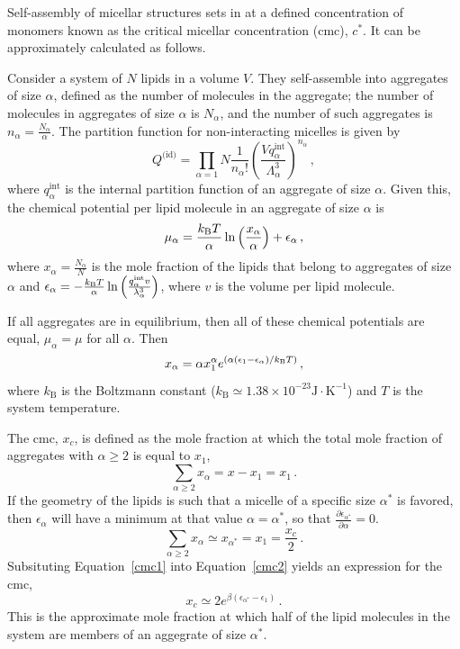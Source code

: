Self-assembly of micellar structures sets in at a defined concentration of monomers known as the critical micellar concentration (cmc), $c^*$.
It can be approximately calculated as follows.

Consider a system of $N$ lipids in a volume $V$.
They self-assemble into aggregates of size $\alpha$, defined as the number of molecules in the aggregate; the number of molecules in aggregates of size $\alpha$ is $N_\alpha$, and the number of such aggregates is $n_\alpha = \frac{N_\alpha}{\alpha}$.
The partition function for non-interacting micelles is given by
\begin{equation}
Q^{\textrm {(id)}} = \prod_{\alpha = 1}{N} \frac{1}{n_\alpha!} \left(\frac{V q_\alpha^{\textrm {int}}}{\Lambda_\alpha^3}\right)^{n_\alpha} \,,
\end{equation}
where $q_\alpha^{\textrm {int}}$ is the internal partition function of an aggregate of size $\alpha$.
Given this, the chemical potential per lipid molecule in an aggregate of size $\alpha$ is
\begin{equation}
\mu_\alpha = \frac{k_{\textrm B} T}{\alpha} \ln\left(\frac{x_\alpha}{\alpha}\right) + \epsilon_\alpha \,,
\end{equation}
where $x_\alpha = \frac{N_\alpha}{N}$ is the mole fraction of the lipids that belong to aggregates of size $\alpha$ and $\epsilon_\alpha = -\frac{k_{\textrm B}T}{\alpha}\ln \left(\frac{q_\alpha^{\textrm {int}} v}{\lambda_\alpha^3}\right)$, where $v$ is the volume per lipid molecule.

If all aggregates are in equilibrium, then all of these chemical potentials are equal, $\mu_\alpha = \mu$ for all $\alpha$.
Then
\begin{equation}
x_{\alpha} = \alpha x_1^\alpha e^{(\alpha(\epsilon_1-\epsilon_\alpha)/k_{\textrm B}T)} \,,\label{cmc1}
\end{equation}
where $k_{\textrm {B}}$ is the Boltzmann constant ($k_{\textrm {B}} \simeq 1.38 \times 10^{-23} \textrm{J} \cdot \textrm{K}^{-1}$) and $T$ is the system temperature.

The cmc, $x_c$, is defined as the mole fraction at which the total mole fraction of aggregates with $\alpha \geq 2$ is equal to $x_1$,
\begin{equation}\sum_{\alpha \geq 2} x_\alpha = x - x_1 = x_1\,.\end{equation}
If the geometry of the lipids is such that a micelle of a specific size $\alpha^*$ is favored, then $\epsilon_\alpha$ will have a minimum at that value $\alpha = \alpha^*$, so that $\frac{\partial \epsilon_{\alpha^*}}{\partial \alpha} = 0$.
\begin{equation}\sum_{\alpha \geq 2} x_\alpha \simeq x_{\alpha^*} = x_1 = \frac{x_c}{2}\,.\label{cmc2}\end{equation}
Subsituting Equation~\ref{cmc1} into Equation~\ref{cmc2} yields an expression for the cmc,
\begin{equation}
	x_c \simeq 2 e^{\beta(\epsilon_{\alpha^*}-\epsilon_1)} \,. 
\end{equation}
This is the approximate mole fraction at which half of the lipid molecules in the system are members of an aggegrate of size $\alpha^*$.

